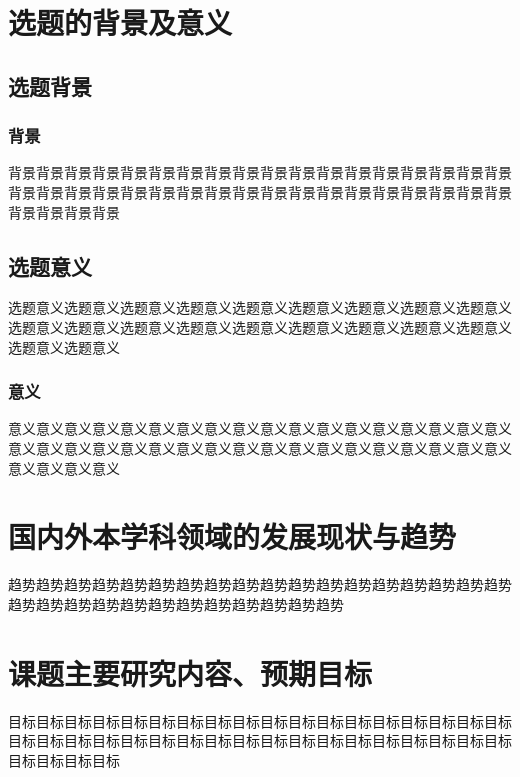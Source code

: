 \section{选题的背景及意义}

\subsection{选题背景}


\subsubsection{背景}

背景背景背景背景背景背景背景背景背景背景背景背景背景背景背景背景背景背景背景背景背景背景背景背景背景背景背景背景背景背景背景背景背景背景背景背景背景背景背景背景

\subsection{选题意义}

选题意义选题意义选题意义选题意义选题意义选题意义选题意义选题意义选题意义选题意义选题意义选题意义选题意义选题意义选题意义选题意义选题意义选题意义选题意义选题意义

\subsubsection{意义}

意义意义意义意义意义意义意义意义意义意义意义意义意义意义意义意义意义意义意义意义意义意义意义意义意义意义意义意义意义意义意义意义意义意义意义意义意义意义意义意义

\section{国内外本学科领域的发展现状与趋势}

趋势趋势趋势趋势趋势趋势趋势趋势趋势趋势趋势趋势趋势趋势趋势趋势趋势趋势趋势趋势趋势趋势趋势趋势趋势趋势趋势趋势趋势趋势

\section{课题主要研究内容、预期目标}

目标目标目标目标目标目标目标目标目标目标目标目标目标目标目标目标目标目标目标目标目标目标目标目标目标目标目标目标目标目标目标目标目标目标目标目标目标目标目标目标

